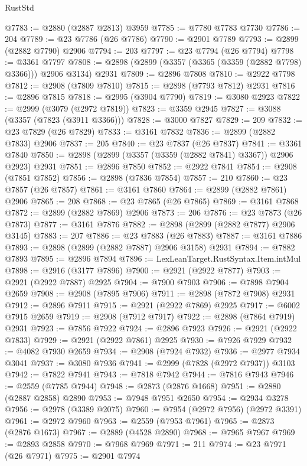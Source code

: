 \begin{lexlean}{RustStd}
\begin{coremodule}
@7783 := @2880 (@2887 @2813) @3959
@7785 := @7780 @7783 @7730
@7786 := 204
@7789 := @23 @7786 (@26 @7786)
@7790 := @2901 @7789
@7793 := @2899 (@2882 @7790) @2906
@7794 := 203
@7797 := @23 @7794 (@26 @7794)
@7798 := @3361 @7797
@7808 := @2898 (@2899 (@3357 (@3365 (@3359 (@2882 @7798) @3366))) @2906 @3134) @2931
@7809 := @2896 @7808
@7810 := @2922 @7798
@7812 := @2908 (@7809 @7810)
@7815 := @2898 (@7793 @7812) @2931
@7816 := @2896 @7815
@7818 := @2995 (@3904 @7790)
@7819 := @3080 @2923
@7822 := @2999 (@3079 (@2972 @7819))
@7823 := @3359 @2945
@7827 := @3088 (@3357 (@7823 (@3911 @3366)))
@7828 := @3000 @7827
@7829 := 209
@7832 := @23 @7829 (@26 @7829)
@7833 := @3161 @7832
@7836 := @2899 (@2882 @7833) @2906
@7837 := 205
@7840 := @23 @7837 (@26 @7837)
@7841 := @3361 @7840
@7850 := @2898 (@2899 (@3357 (@3359 (@2882 @7841) @3367)) @2906 @2923) @2931
@7851 := @2896 @7850
@7852 := @2922 @7841
@7854 := @2908 (@7851 @7852)
@7856 := @2898 (@7836 @7854)
@7857 := 210
@7860 := @23 @7857 (@26 @7857)
@7861 := @3161 @7860
@7864 := @2899 (@2882 @7861) @2906
@7865 := 208
@7868 := @23 @7865 (@26 @7865)
@7869 := @3161 @7868
@7872 := @2899 (@2882 @7869) @2906
@7873 := 206
@7876 := @23 @7873 (@26 @7873)
@7877 := @3161 @7876
@7882 := @2898 (@2899 (@2882 @7877) @2906 @3145)
@7883 := 207
@7886 := @23 @7883 (@26 @7883)
@7887 := @3161 @7886
@7893 := @2898 (@2899 (@2882 @7887) @2906 @3158) @2931
@7894 := @7882 @7893
@7895 := @2896 @7894
@7896 := LexLeanTarget.RustSyntax.Item.intMul
@7898 := @2916 (@3177 @7896)
@7900 := @2921 (@2922 @7877)
@7903 := @2921 (@2922 @7887) @2925
@7904 := @7900 @7903
@7906 := @7898 @7904 @2659
@7908 := @2908 (@7895 @7906)
@7911 := @2898 (@7872 @7908) @2931
@7912 := @2896 @7911
@7915 := @2921 (@2922 @7869) @2925
@7917 := @6002 @7915 @2659
@7919 := @2908 (@7912 @7917)
@7922 := @2898 (@7864 @7919) @2931
@7923 := @7856 @7922
@7924 := @2896 @7923
@7926 := @2921 (@2922 @7833)
@7929 := @2921 (@2922 @7861) @2925
@7930 := @7926 @7929
@7932 := @4082 @7930 @2659
@7934 := @2908 (@7924 @7932)
@7936 := @2977 @7934 @3041
@7937 := @3080 @7936
@7941 := @2999 (@7828 (@2972 @7937)) @3103
@7942 := @7822 @7941
@7943 := @7818 @7942
@7944 := @7816 @7943
@7946 := @2559 (@7785 @7944)
@7948 := @2873 (@2876 @1668)
@7951 := @2880 (@2887 @2858) @2890
@7953 := @7948 @7951 @2650
@7954 := @2934 @3278
@7956 := @2978 (@3389 @2075)
@7960 := @7954 (@2972 @7956) (@2972 @3391)
@7961 := @2972 @7960
@7963 := @2559 (@7953 @7961)
@7965 := @2873 (@2876 @1673)
@7967 := @2889 (@4528 @2890)
@7968 := @7965 @7967
@7969 := @2893 @2858
@7970 := @7968 @7969
@7971 := 211
@7974 := @23 @7971 (@26 @7971)
@7975 := @2901 @7974

\end{coremodule}
\end{lexlean}
